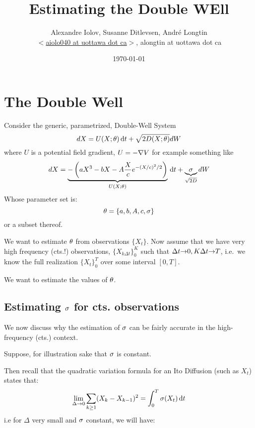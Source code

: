 \documentclass{article}
\begin{document}
\title{Estimating the Double WEll} \author{Alexandre Iolov, Susanne
Ditlevsen, Andr\'e Longtin  \\ $<$\href{mailto:aiolo040@uottawa.ca}
		{aiolo040 at uottawa dot ca}$>$, alongtin at uottawa dot ca}

\date{\today}

\maketitle


\tableofcontents

\section{The Double Well}
Consider the generic, parametrized,  Double-Well System 
\begin{equation}
dX = U(X; {\theta}) \, \mathrm{d} t + \sqrt{2D(X; {\theta})} dW
\label{eq:SDE_evolution} 
\end{equation}
where $U$ is a potential field gradient, $U = -{ \nabla } V$ for example something
like
\begin{equation}
dX = \underbrace{-\left( aX^3 - bX -A \frac Xc e^{-(X/c)^2/2} \right) }_{U(X;
{\theta})} \, \mathrm{d} t + \underbrace{{\sigma }}_{\sqrt{2D}} dW
\label{eq:OU_evolution} 
\end{equation}
Whose parameter set is:
$$
{\theta} = \{a, b, A, c, {\sigma }\}
$$
or a subset thereof.

We want to estimate ${\theta}$  from observations $\{ X_t \}$. Now assume that we
have very high frequency (cts.!) observations, $\{X_{k\Delta t}\}_0^K$ such that
$\Delta t {\rightarrow} 0, K\Delta t {\rightarrow} T$, i.e.\ we know the full realization
$\{X_t\}_0^T$ over some interval $[0,T]$.

We want to estimate the values of ${\theta}$. 

\subsection{Estimating ${\sigma }$ for cts. observations}

We now discuss why the estimation of ${\sigma }$ can be fairly accurate in the
high-frequency (cts.) context. 

Suppose, for illustration sake that ${\sigma }$ is constant. 

Then recall that the quadratic variation formula for an Ito Diffusion (such as
$X_t$) states that:
\begin{equation}
\lim_{\Delta {\rightarrow} 0} \sum_{k\geq 1} (X_k - X_{k-1})^2 = \int_0^T \sigma(X_t)
\, \mathrm{d} t   
\label{eq:sigma_est_quad_variation}
\end{equation}
i.e for $\Delta$ very small and ${\sigma }$ constant, we will have:
\end{document}
